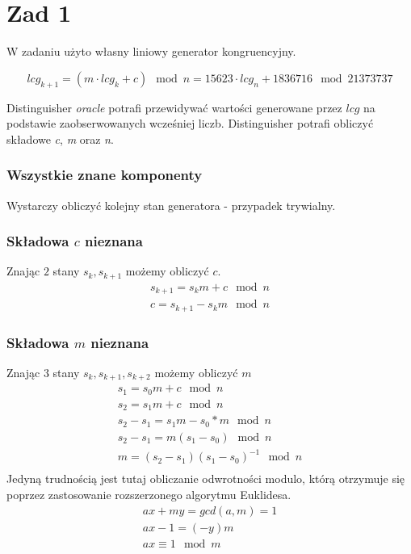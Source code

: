 \section*{Zad 1}
W zadaniu użyto własny liniowy generator kongruencyjny.

$$ lcg_{k+1} = (m \cdot lcg_{k} + c) \mod n = 15623 \cdot lcg_n + 1836716 \mod 21373737$$

Distinguisher \emph{oracle} potrafi przewidywać wartości generowane przez $lcg$ na podstawie zaobserwowanych wcześniej liczb. Distinguisher potrafi obliczyć składowe \emph{c}, \emph{m} oraz \emph{n}.

\subsubsection*{Wszystkie znane komponenty}
Wystarczy obliczyć kolejny stan generatora - przypadek trywialny.
\subsubsection*{Składowa $c$ nieznana}
Znając $2$ stany $s_k, s_{k+1}$ możemy obliczyć $c$.
\begin{align*}
    s_{k+1} = s_k m + c \mod n \\
    c = s_{k+1} - s_k m \mod n
\end{align*}

\subsubsection*{Składowa $m$ nieznana}
Znając $3$ stany $s_k, s_{k+1}, s_{k+2}$ możemy obliczyć $m$
\begin{align*}
    s_1 = s_0 m + c  \mod n \\
    s_2 = s_1 m + c  \mod n \\
    s_2 - s_1 = s_1 m - s_0*m  \mod n \\
    s_2 - s_1 = m(s_1 - s_0)  \mod n \\
    m = (s_2 - s_1)(s_1 - s_0)^{-1} \mod n \\
\end{align*}
Jedyną trudnością jest tutaj obliczanie odwrotności modulo, którą otrzymuje się poprzez zastosowanie rozszerzonego algorytmu Euklidesa.
\begin{align*}
    ax + my = gcd(a,m) = 1 \\
    ax - 1 = (-y)m \\
    ax \equiv 1 \mod m
\end{align*}

